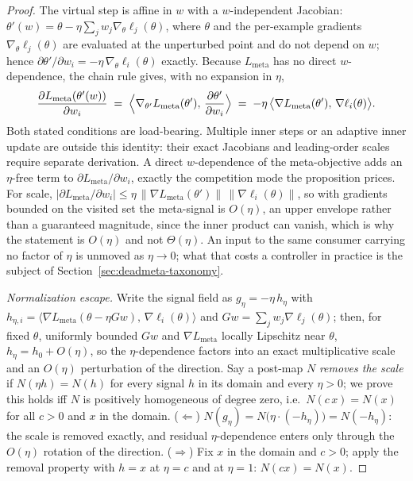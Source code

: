 \begin{proof}
The virtual step is affine in $w$ with a $w$-independent Jacobian:
$\theta'(w) = \theta - \eta \sum_j w_j \nabla_\theta \ell_j(\theta)$,
where $\theta$ and the per-example gradients
$\nabla_\theta \ell_j(\theta)$ are evaluated at the unperturbed point and
do not depend on $w$; hence
$\partial \theta' / \partial w_i = -\eta\, \nabla_\theta \ell_i(\theta)$
exactly. Because $L_{\mathrm{meta}}$ has no direct $w$-dependence, the
chain rule gives, with no expansion in $\eta$,
\[
\frac{\partial L_{\mathrm{meta}}(\theta'(w))}{\partial w_i}
\;=\; \Bigl\langle \nabla_{\theta'} L_{\mathrm{meta}}(\theta'),\,
\frac{\partial \theta'}{\partial w_i} \Bigr\rangle
\;=\; -\eta\, \bigl\langle \nabla L_{\mathrm{meta}}(\theta'),\,
\nabla \ell_i(\theta) \bigr\rangle .
\]
Both stated conditions are load-bearing. Multiple inner steps or an
adaptive inner update are outside this identity: their exact Jacobians and
leading-order scales require separate derivation. A direct $w$-dependence
of the meta-objective adds an
$\eta$-free term to $\partial L_{\mathrm{meta}} / \partial w_i$, exactly
the competition mode the proposition prices. For scale,
$|\partial L_{\mathrm{meta}} / \partial w_i| \le
\eta\, \lVert \nabla L_{\mathrm{meta}}(\theta') \rVert\,
\lVert \nabla \ell_i(\theta) \rVert$, so with gradients bounded on the
visited set the meta-signal is $O(\eta)$, an upper envelope rather than
a guaranteed magnitude, since the inner product can vanish, which is why
the statement is $O(\eta)$ and not $\Theta(\eta)$. An input to the same
consumer carrying no factor of $\eta$ is unmoved as $\eta \to 0$; what that
costs a controller in practice is the subject of
Section~\ref{sec:deadmeta-taxonomy}.

\emph{Normalization escape.} Write the signal field as
$g_\eta = -\eta\, h_\eta$ with
$h_{\eta,i} = \langle \nabla L_{\mathrm{meta}}(\theta - \eta G w),\,
\nabla \ell_i(\theta) \rangle$ and
$Gw = \sum_j w_j \nabla \ell_j(\theta)$; then, for fixed $\theta$,
uniformly bounded $Gw$ and $\nabla L_{\mathrm{meta}}$ locally Lipschitz near $\theta$,
$h_\eta = h_0 + O(\eta)$, so the $\eta$-dependence factors into an exact
multiplicative scale and an $O(\eta)$ perturbation of the direction. Say a
post-map $N$ \emph{removes the scale} if $N(\eta h) = N(h)$ for every
signal $h$ in its domain and every $\eta > 0$; we prove this holds iff $N$
is positively homogeneous of degree zero, i.e.\ $N(c\,x) = N(x)$ for all
$c > 0$ and $x$ in the domain.
($\Leftarrow$) $N(g_\eta) = N\bigl(\eta \cdot (-h_\eta)\bigr) =
N(-h_\eta)$: the scale is removed exactly, and residual $\eta$-dependence
enters only through the $O(\eta)$ rotation of the direction.
($\Rightarrow$) Fix $x$ in the domain and $c > 0$; apply the removal
property with $h = x$ at $\eta = c$ and at $\eta = 1$:
$N(cx) = N(x)$.
\end{proof}

